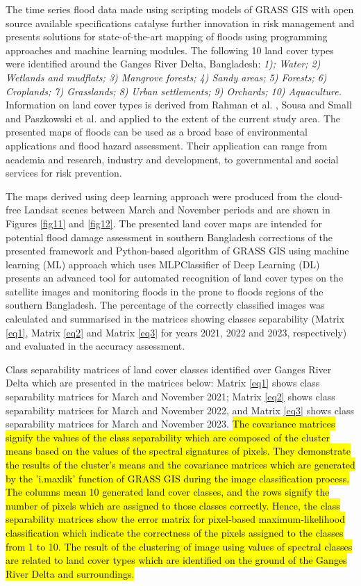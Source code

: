 \documentclass[water,article,submit,pdftex,moreauthors]{Definitions/mdpi}
\begin{document}
The time series flood data made using scripting models of GRASS GIS with open source available specifications catalyse further innovation in risk management and presents solutions for state-of-the-art mapping of floods using programming approaches and machine learning modules. The following 10 land cover types were identified around the Ganges River Delta, Bangladesh: \emph{1); Water; 2) Wetlands and mudflats; 3) Mangrove forests; 4) Sandy areas; 5) Forests; 6) Croplands; 7) Grasslands; 8) Urban settlements; 9) Orchards; 10) Aquaculture.} Information on land cover types is derived from Rahman et al. \cite{Rahman2020}, Sousa and Small \cite{rs13234799} and Paszkowski et al. \cite{Paszkowski2021} and applied to the extent of the current study area. The presented maps of floods can be used as a broad base of environmental applications and flood hazard assessment. Their application can range from academia and research, industry and development, to governmental and social services for risk prevention. 

The maps derived using deep learning approach were produced from the cloud-free Landsat scenes between March and November periods and are shown in Figures \ref{fig11} and \ref{fig12}. The presented land cover maps are intended for potential flood damage assessment in southern Bangladesh corrections of the presented framework and Python-based algorithm of GRASS GIS using machine learning (ML) approach which uses MLPClassifier of Deep Learning (DL) presents an advanced tool for automated recognition of land cover types on the satellite images and monitoring floods in the prone to floods regions of the southern Bangladesh. The percentage of the correctly classified images was calculated and summarised in the matrices showing classes separability (Matrix \ref{eq1}, Matrix \ref{eq2} and Matrix \ref{eq3} for years 2021, 2022 and 2023, respectively) and evaluated in the accuracy assessment. 

Class separability matrices of land cover classes identified over Ganges River Delta which are presented in the matrices below: Matrix \ref{eq1} shows class separability matrices for March and November 2021; Matrix \ref{eq2} shows class separability matrices for March and November 2022, and Matrix \ref{eq3} shows class separability matrices for March and November 2023. \hl{The covariance matrices signify the values of the class separability which are composed of the cluster means based on the values of the spectral signatures of pixels. They demonstrate the results of the cluster's means and the covariance matrices which are generated by the 'i.maxlik' function of GRASS GIS during the image classification process. The columns mean 10 generated land cover classes, and the rows signify the number of pixels which are assigned to those classes correctly. Hence, the class separability matrices show the error matrix for pixel-based maximum-likelihood classification which indicate the correctness of the pixels assigned to the classes from 1 to 10. The result of the clustering of image using values of spectral classes are related to land cover types which are identified on the ground of the Ganges River Delta and surroundings. }
\end{document}
